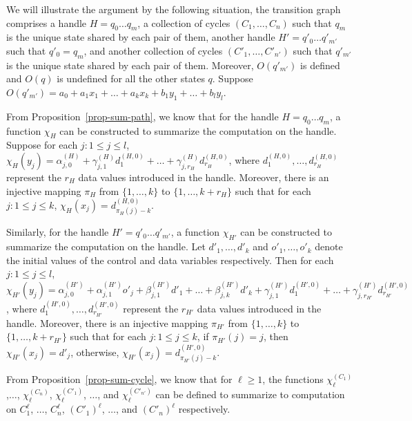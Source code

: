 We will illustrate the argument by the following situation, the transition graph comprises a handle $H=q_0\dots q_{m}$,  a collection of cycles $(C_1,\dots,C_n)$ such that $q_m$ is the unique state shared by each pair of them, another handle $H'=q'_0 \dots q'_{m'}$ such that $q'_0=q_m$, and another collection of cycles $(C'_1,\dots,C'_{n'})$ such that $q'_{m'}$ is the unique state shared by each pair of them. Moreover, $O(q'_{m'})$ is defined and $O(q)$ is undefined for all the other states $q$. Suppose $O(q'_{m'}) = a_0 + a_1 x_1 + \dots + a_k x_k + b_1 y_1 + \dots + b_l y_l$.

From Proposition~\ref{prop-sum-path}, we know that 
for the handle $H = q_0 \dots q_m$, a function $\chi_H$ can be constructed to summarize the computation on the handle. Suppose for each $j: 1 \le j \le l$,  $\chi_H(y_j) = \alpha^{(H)}_{j,0} + \gamma^{(H)}_{j,1} d^{(H,0)}_1 + \dots + \gamma^{(H)}_{j,r_H} d^{(H,0)}_{r_H}$, where $d^{(H,0)}_1,\dots, d^{(H,0)}_{r_H}$ represent the $r_H$ data values introduced in the handle. Moreover, there is an injective mapping $\pi_H$ from $\{1,\dots,k\}$ to $\{1,\dots,k+r_H\}$ such that for each $j: 1 \le j \le k$, $\chi_H(x_j) = d^{(H,0)}_{\pi_H(j)-k}$.

Similarly, for the handle $H' = q'_0 \dots q'_{m'}$, a function $\chi_{H'}$ can be constructed to summarize the computation on the handle. Let $d'_1,\dots,d'_k$ and $o'_1,\dots,o'_k$ denote the initial values of the control and data variables respectively. Then for each $j: 1 \le j \le l$,  $\chi_{H'}(y_j) = \alpha^{(H')}_{j,0} + \alpha^{(H')}_{j,1} o'_j + \beta^{(H')}_{j,1} d'_1 + \dots + \beta^{(H')}_{j,k} d'_{k}+ \gamma^{(H')}_{j,1} d^{(H',0)}_1 + \dots + \gamma^{(H')}_{j,r_{H'}} d^{(H',0)}_{r_{H'}}$, where $d^{(H',0)}_1,\dots, d^{(H',0)}_{r_{H'}}$ represent the $r_{H'}$ data values introduced in the handle. Moreover, there is an injective mapping $\pi_{H'}$ from $\{1,\dots,k\}$ to $\{1,\dots,k+r_{H'}\}$ such that for each $j: 1 \le j \le k$, if $\pi_{H'}(j)=j$, then $\chi_{H'}(x_j) = d'_j$, otherwise, $\chi_{H'}(x_j) = d^{(H',0)}_{\pi_{H'}(j)-k}$.

From Proposition~\ref{prop-sum-cycle}, we know that for $\ell \ge 1$, the functions $\chi^{(C_1)}_{\ell}$,$\dots$, $\chi^{(C_n)}_{\ell}$, $\chi^{(C'_1)}_{\ell}$, $\dots$, and $\chi^{(C'_{n'})}_{\ell}$ can be defined to summarize to computation on $C^{\ell}_1$, $\dots$, $C^{\ell}_n$, $(C'_1)^{\ell}$, $\dots$, and $(C'_n)^{\ell}$ respectively. 

